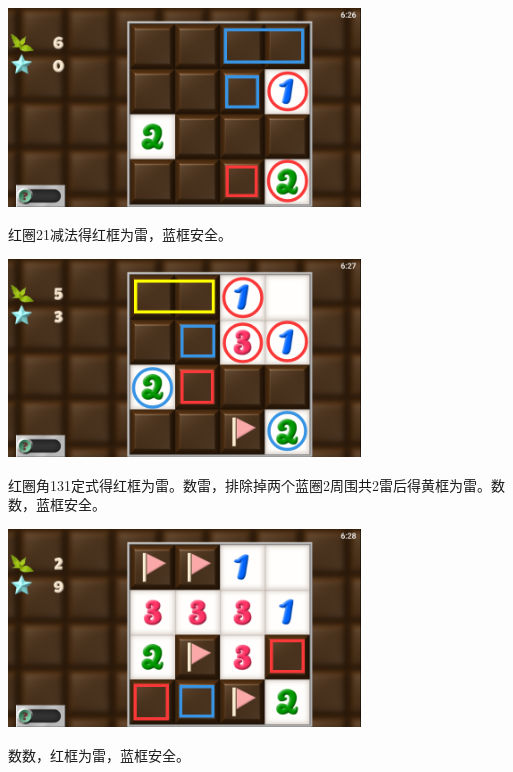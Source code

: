 \subsection{} %
\begin{center}
    \includegraphics[width=0.7\textwidth]{puzzle/106-1.png}
\end{center}
红圈21减法得红框为雷，蓝框安全。
\begin{center}
    \includegraphics[width=0.7\textwidth]{puzzle/106-2.png}
\end{center}
红圈角131定式得红框为雷。数雷，排除掉两个蓝圈2周围共2雷后得黄框为雷。数数，蓝框安全。
\begin{center}
    \includegraphics[width=0.7\textwidth]{puzzle/106-3.png}
\end{center}
数数，红框为雷，蓝框安全。

